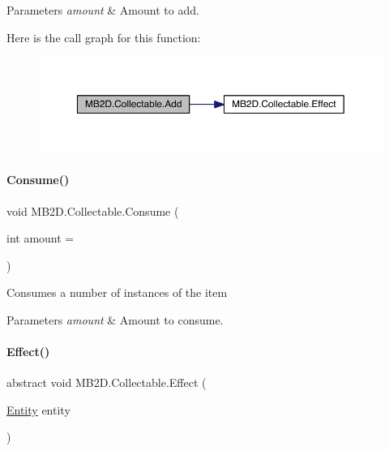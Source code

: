 \begin{DoxyParams}{Parameters}
{\em amount} & Amount to add.\\
\hline
\end{DoxyParams}
Here is the call graph for this function\+:
\nopagebreak
\begin{figure}[H]
\begin{center}
\leavevmode
\includegraphics[width=350pt]{class_m_b2_d_1_1_collectable_a81e5756a4f1420a28674502724fc2191_cgraph}
\end{center}
\end{figure}
\hypertarget{class_m_b2_d_1_1_collectable_a089723a457d6a6d9249e44477f25ab9d}{}\label{class_m_b2_d_1_1_collectable_a089723a457d6a6d9249e44477f25ab9d} 
\paragraph{\texorpdfstring{Consume()}{Consume()}}
{\footnotesize\ttfamily void M\+B2\+D.\+Collectable.\+Consume (\begin{DoxyParamCaption}\item[{int}]{amount = {} }\end{DoxyParamCaption})\hspace{0.3cm}{\ttfamily [inline]}}



Consumes a number of instances of the item 


\begin{DoxyParams}{Parameters}
{\em amount} & Amount to consume.\\
\hline
\end{DoxyParams}
\hypertarget{class_m_b2_d_1_1_collectable_aeb2c8847eb3d5937b015f298703fd753}{}\label{class_m_b2_d_1_1_collectable_aeb2c8847eb3d5937b015f298703fd753} 
\paragraph{\texorpdfstring{Effect()}{Effect()}}
{\footnotesize\ttfamily abstract void M\+B2\+D.\+Collectable.\+Effect (\begin{DoxyParamCaption}\item[{\hyperlink{class_m_b2_d_1_1_entity_component_1_1_entity}{Entity}}]{entity }\end{DoxyParamCaption})\hspace{0.3cm}{\ttfamily [pure virtual]}}



